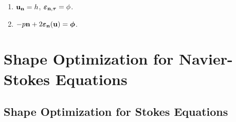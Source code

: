 \documentclass[oneside,11pt]{book}
\numberwithin{equation}{section}
\begin{document}
\begin{enumerate}
    \item ${\bf u}_{\bf n} = h$, $\boldsymbol{\varepsilon}_{{\bf n},\boldsymbol{\tau}} = \phi$.
    \item $-p{\bf n} + 2\boldsymbol{\varepsilon}_{\bf n}({\bf u}) = \boldsymbol{\phi}$.
\end{enumerate}


\part{Shape Optimization for Navier-Stokes Equations}

\chapter{Shape Optimization for Stokes Equations}
\end{document}
